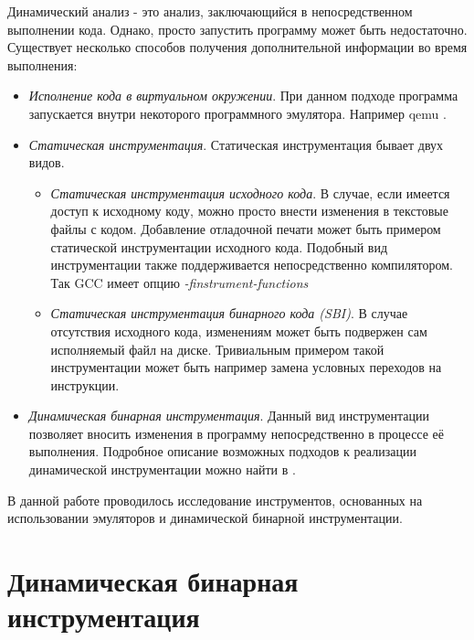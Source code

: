 Динамический анализ - это анализ, заключающийся в непосредственном выполнении кода. Однако, просто запустить программу может быть недостаточно. Существует несколько способов получения дополнительной информации во время выполнения:

\begin{itemize}
\item {\em Исполнение кода в виртуальном окружении}. При данном подходе программа запускается внутри некоторого программного эмулятора. Например qemu \cite{QEMU}.

\item {\em Статическая инструментация}.
Статическая инструментация бывает двух видов.
    \begin{itemize}
        \item {\em Статическая инструментация исходного кода}. В случае, если имеется доступ к исходному коду, можно просто внести изменения в текстовые файлы с кодом. Добавление отладочной печати может быть примером статической инструментации исходного кода. Подобный вид инструментации также поддерживается непосредственно компилятором. Так GCC имеет опцию  \textit{-finstrument-functions}
        \item {\em Статическая инструментация бинарного кода (SBI)}. В случае отсутствия исходного кода, изменениям может быть подвержен сам исполняемый файл на диске. Тривиальным примером такой инструментации может быть например замена условных переходов на  инструкции. 
    \end{itemize}

\item {\em Динамическая бинарная инструментация}. Данный вид инструментации позволяет вносить изменения в программу непосредственно в процессе её выполнения. Подробное описание возможных подходов к реализации динамической инструментации можно найти в \cite{PBA}.
\end{itemize}

В данной работе проводилось исследование инструментов, основанных на использовании эмуляторов и динамической бинарной инструментации.


\section{Динамическая бинарная инструментация}

